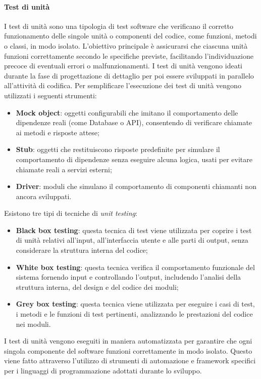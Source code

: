 \paragraph{Test di unità}
I test di unità sono una tipologia di test software che verificano il corretto funzionamento delle singole unità o componenti del codice, come funzioni, metodi o classi, in modo isolato. 
L'obiettivo principale è assicurarsi che ciascuna unità funzioni correttamente secondo le specifiche previste, facilitando l'individuazione precoce di eventuali errori o malfunzionamenti.
I test di unità vengono ideati durante la fase di progettazione di dettaglio per poi essere sviluppati in parallelo all'attività di codifica.
Per semplificare l'esecuzione dei test di unità vengono utilizzati i seguenti strumenti:
\begin{itemize}
    \item \textbf{Mock object}: oggetti configurabili che imitano il comportamento delle dipendenze reali (come Database o API), consentendo di verificare chiamate ai metodi e risposte attese;
    \item \textbf{Stub}: oggetti che restituiscono risposte predefinite per simulare il comportamento di dipendenze senza eseguire alcuna logica, usati per evitare chiamate reali a servizi esterni;
    \item \textbf{Driver}: moduli che simulano il comportamento di componenti chiamanti non ancora sviluppati.
\end{itemize}
Esistono tre tipi di tecniche di \textit{unit testing}:
\begin{itemize}
    \item \textbf{Black box testing}: questa tecnica di test viene utilizzata per coprire i test di unità relativi all'input, all'interfaccia utente e alle parti di output, senza considerare la struttura interna del codice;
    \item \textbf{White box testing}: questa tecnica verifica il comportamento funzionale del sistema fornendo input e controllando l'output, includendo l'analisi della struttura interna, del design e del codice dei moduli;
    \item \textbf{Grey box testing}: questa tecnica viene utilizzata per eseguire i casi di test, i metodi e le funzioni di test pertinenti, analizzando le prestazioni del codice nei moduli.
\end{itemize}
I test di unità vengono eseguiti in maniera automatizzata per garantire che ogni singola componente del software funzioni correttamente in modo isolato.
Questo viene fatto attraverso l'utilizzo di strumenti di automazione e framework specifici per i linguaggi di programmazione adottati durante lo sviluppo.

